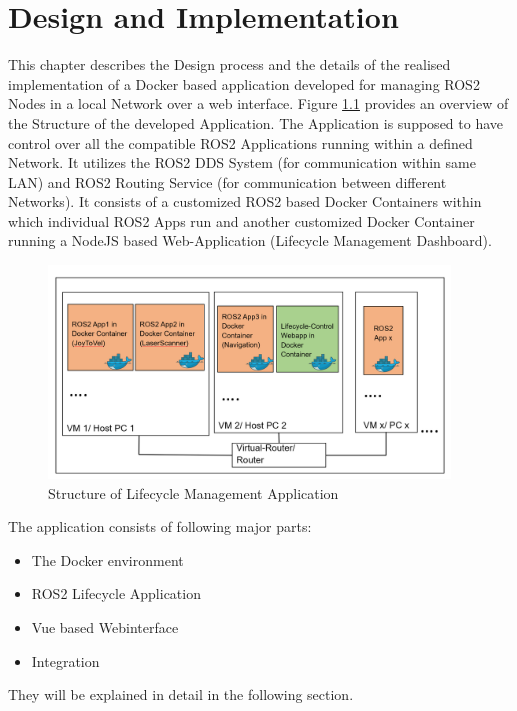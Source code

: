 \chapter{Design and Implementation}
\label{Implementation}

This chapter describes the Design process and the details of the realised implementation of a Docker based application developed for managing ROS2 Nodes in a local Network over a web interface. Figure \ref*{fig:Background:LifecycleManagement} provides an overview of the Structure of the developed Application. The Application is supposed to have control over all the compatible ROS2 Applications running within a defined Network. It utilizes the ROS2 DDS System (for communication within same LAN) and ROS2 Routing Service (for communication between different Networks). It consists of a customized ROS2 based Docker Containers within which individual ROS2 Apps run and another customized Docker Container running a NodeJS based Web-Application (Lifecycle Management Dashboard).   

\begin{figure}[H]
	\centering
	\includegraphics[width=0.95\textwidth]{"Bilder/Application-Structure.png"}
	\caption{Structure of Lifecycle Management Application}
	\label{fig:Background:LifecycleManagement}					
\end{figure}
The application consists of following major parts:

\begin{itemize}
	\item The Docker environment
	\item ROS2 Lifecycle Application
	\item Vue based Webinterface
	\item Integration
\end{itemize}

They will be explained in detail in the following section.

